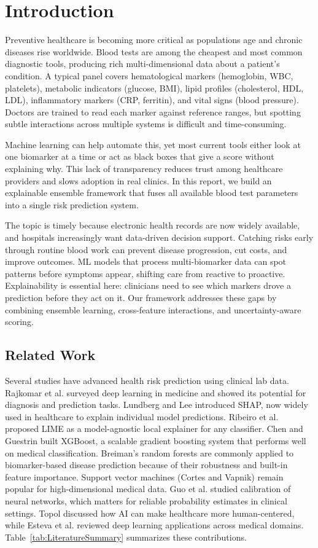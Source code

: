 \documentclass[journal, onecolumn]{IEEEtran}
\begin{document}
\section{Introduction}
Preventive healthcare is becoming more critical as populations age and chronic diseases rise worldwide.
Blood tests are among the cheapest and most common diagnostic tools, producing rich multi-dimensional data about a patient's condition.
A typical panel covers hematological markers (hemoglobin, WBC, platelets), metabolic indicators (glucose, BMI), lipid profiles (cholesterol, HDL, LDL), inflammatory markers (CRP, ferritin), and vital signs (blood pressure).
Doctors are trained to read each marker against reference ranges, but spotting subtle interactions across multiple systems is difficult and time-consuming.

Machine learning can help automate this, yet most current tools either look at one biomarker at a time or act as black boxes that give a score without explaining why.
This lack of transparency reduces trust among healthcare providers and slows adoption in real clinics.
In this report, we build an explainable ensemble framework that fuses all available blood test parameters into a single risk prediction system.

The topic is timely because electronic health records are now widely available, and hospitals increasingly want data-driven decision support.
Catching risks early through routine blood work can prevent disease progression, cut costs, and improve outcomes.
ML models that process multi-biomarker data can spot patterns before symptoms appear, shifting care from reactive to proactive.
Explainability is essential here: clinicians need to see which markers drove a prediction before they act on it.
Our framework addresses these gaps by combining ensemble learning, cross-feature interactions, and uncertainty-aware scoring.

\subsection{Related Work}
Several studies have advanced health risk prediction using clinical lab data.
Rajkomar et al. surveyed deep learning in medicine and showed its potential for diagnosis and prediction tasks.
Lundberg and Lee introduced SHAP, now widely used in healthcare to explain individual model predictions.
Ribeiro et al. proposed LIME as a model-agnostic local explainer for any classifier.
Chen and Guestrin built XGBoost, a scalable gradient boosting system that performs well on medical classification.
Breiman's random forests are commonly applied to biomarker-based disease prediction because of their robustness and built-in feature importance.
Support vector machines (Cortes and Vapnik) remain popular for high-dimensional medical data.
Guo et al. studied calibration of neural networks, which matters for reliable probability estimates in clinical settings.
Topol discussed how AI can make healthcare more human-centered, while Esteva et al. reviewed deep learning applications across medical domains.
Table~\ref{tab:LiteratureSummary} summarizes these contributions.
\end{document}
